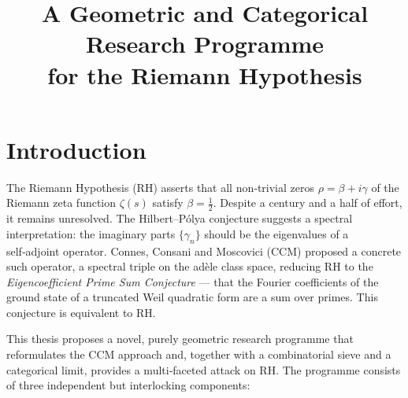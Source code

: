 \documentclass[12pt,a4paper,twoside]{book}
\title{\bf A Geometric and Categorical Research Programme\\ for the Riemann Hypothesis}
\author{}
\date{}
\begin{document}
\maketitle
\tableofcontents

\chapter{Introduction}

The Riemann Hypothesis (RH) asserts that all non‑trivial zeros \(\rho = \beta + i\gamma\) of the Riemann zeta function \(\zeta(s)\) satisfy \(\beta = \frac12\).  Despite a century and a half of effort, it remains unresolved.  The Hilbert–Pólya conjecture suggests a spectral interpretation: the imaginary parts \(\{\gamma_n\}\) should be the eigenvalues of a self‑adjoint operator.  Connes, Consani and Moscovici (CCM) \cite{CCM} proposed a concrete such operator, a spectral triple on the adèle class space, reducing RH to the \emph{Eigencoefficient Prime Sum Conjecture} — that the Fourier coefficients of the ground state of a truncated Weil quadratic form are a sum over primes.  This conjecture is equivalent to RH.

This thesis proposes a novel, purely geometric research programme that reformulates the CCM approach and, together with a combinatorial sieve and a categorical limit, provides a multi‑faceted attack on RH.  The programme consists of three independent but interlocking components:
\end{document}
